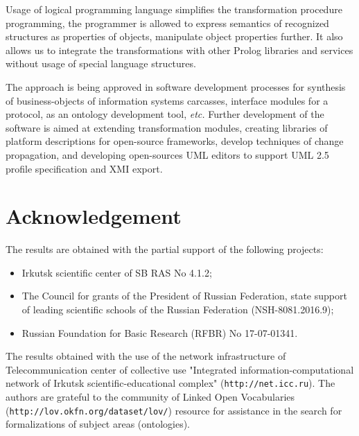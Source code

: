\documentclass[conference,a4paper]{IEEEtran}
\providecommand\url[1]{\texttt{#1}}
\begin{document}
Usage of logical programming language simplifies the transformation procedure programming, the programmer is allowed to express semantics of recognized structures as properties of objects, manipulate object properties further. It also allows us to integrate the transformations with other Prolog libraries and services without usage of special language structures.

The approach is being approved in software development processes for synthesis of business-objects of information systems carcasses, interface modules for a protocol, as an ontology development tool, \emph{etc.} Further development of the software is aimed at extending transformation modules, creating libraries of platform descriptions for open-source frameworks, develop techniques of change propagation, and developing open-sources UML editors to support UML 2.5 profile specification and XMI export.


\section*{Acknowledgement}

The results are obtained with the partial support of the following projects:
\begin{itemize}
\item Irkutsk scientific center of SB RAS No 4.1.2;
\item The Council for grants of the President of Russian Federation, state support of leading scientific schools of the Russian Federation (NSH-8081.2016.9);
\item Russian Foundation for Basic Research (RFBR) No 17-07-01341.
\end{itemize}
The results obtained with the use of the network infrastructure of Telecommunication center of collective use "Integrated information-computational network of Irkutsk scientific-educational complex" (\url{http://net.icc.ru}). The authors are grateful to the community of Linked Open Vocabularies (\url{http://lov.okfn.org/dataset/lov/}) resource for assistance in the search for formalizations of subject areas (ontologies).
\end{document}
